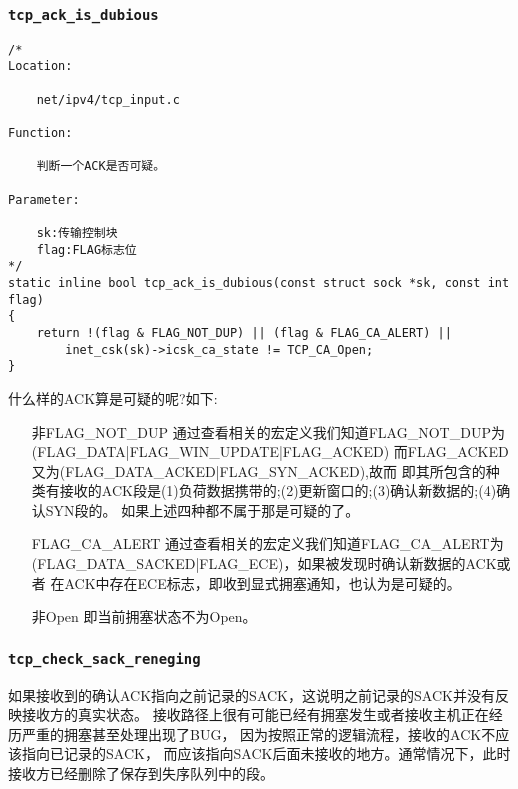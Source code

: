         \subsubsection{\texttt{tcp_ack_is_dubious}}
\begin{verbatim}
/*
Location:

    net/ipv4/tcp_input.c

Function:

    判断一个ACK是否可疑。

Parameter:

    sk:传输控制块
    flag:FLAG标志位
*/
static inline bool tcp_ack_is_dubious(const struct sock *sk, const int flag)
{
    return !(flag & FLAG_NOT_DUP) || (flag & FLAG_CA_ALERT) ||
        inet_csk(sk)->icsk_ca_state != TCP_CA_Open;
}
\end{verbatim}

    什么样的ACK算是可疑的呢?如下:
\begin{enumerate}
\item[非FLAG\_NOT\_DUP] 通过查看相关的宏定义我们知道FLAG\_NOT\_DUP为(FLAG\_DATA|FLAG\_WIN\_UPDATE|FLAG\_ACKED)
                        而FLAG\_ACKED又为(FLAG\_DATA\_ACKED|FLAG\_SYN\_ACKED),故而
                        即其所包含的种类有接收的ACK段是(1)负荷数据携带的;(2)更新窗口的;(3)确认新数据的;(4)确认SYN段的。
                        如果上述四种都不属于那是可疑的了。
            
\item[FLAG\_CA\_ALERT]  通过查看相关的宏定义我们知道FLAG\_CA\_ALERT为(FLAG\_DATA\_SACKED|FLAG\_ECE)，如果被发现时确认新数据的ACK或者
                        在ACK中存在ECE标志，即收到显式拥塞通知，也认为是可疑的。\color{red}{似乎和上面的有矛盾，}
\item[非Open]           即当前拥塞状态不为Open。
\end{enumerate}
        \subsubsection{\texttt{tcp_check_sack_reneging}}
            如果接收到的确认ACK指向之前记录的SACK，这说明之前记录的SACK并没有反映接收方的真实状态。
            接收路径上很有可能已经有拥塞发生或者接收主机正在经历严重的拥塞甚至处理出现了BUG，
            因为按照正常的逻辑流程，接收的ACK不应该指向已记录的SACK，
            而应该指向SACK后面未接收的地方。通常情况下，此时接收方已经删除了保存到失序队列中的段。
            
